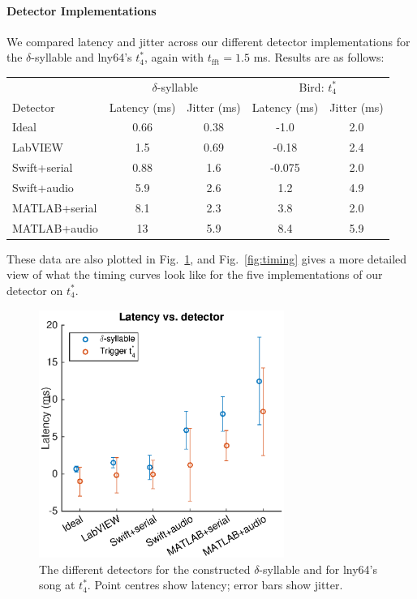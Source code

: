 \documentclass[10pt,letterpaper]{article}
\newcommand\fig[1]{Fig.~\ref{#1}}
\renewcommand{\subsubsection}[1]{\paragraph{#1}}
\begin{document}
\subsubsection{Detector Implementations}


We compared latency and jitter across our different detector
implementations for the $\delta$-syllable and lny64's $t^*_4$, again with
$t_\mathrm{fft}=1.5$ ms.  Results are as follows:
\vspace{8pt}
\begin{tabular}{l|c|c|c|c}
  & \multicolumn{2}{c}{$\delta$-syllable} & \multicolumn{2}{c}{Bird: $t^*_4$} \\
  Detector & Latency (ms) & Jitter (ms) & Latency (ms) & Jitter (ms) \\
  \hline
  Ideal & 0.66 & 0.38 & -1.0 & 2.0 \\
  LabVIEW & 1.5 & 0.69 & -0.18 & 2.4 \\
  Swift+serial & 0.88 & 1.6 & -0.075 & 2.0 \\
  Swift+audio & 5.9 & 2.6 & 1.2 & 4.9 \\
  MATLAB+serial & 8.1 & 2.3 & 3.8 & 2.0 \\
  MATLAB+audio & 13 & 5.9 & 8.4 & 5.9
\end{tabular}
\vspace{8pt}\par\noindent
These data are also plotted in \fig{fig:TimingVsDetector}, and
\fig{fig:timing} gives a more detailed view of what the timing curves
look like for the five implementations of our detector on $t^*_4$.

\begin{figure}
  \begin{center}
    \includegraphics[width=8cm]{Fig6}
  \end{center}
  \caption{The different detectors for the constructed
    $\delta$-syllable and for lny64's song at $t^*_4$.  Point centres
    show latency; error bars show jitter.}
  \label{fig:TimingVsDetector}
\end{figure}
\end{document}

